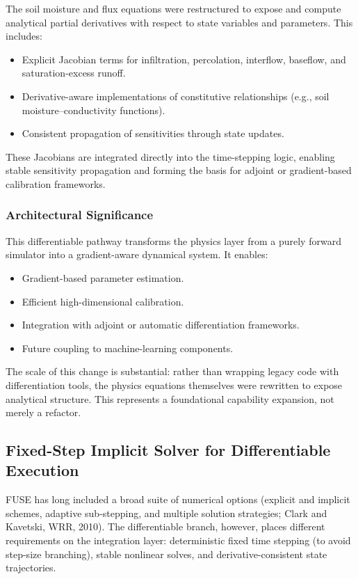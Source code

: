 \documentclass[11pt]{scrartcl}
\begin{document}
The soil moisture and flux equations were restructured to expose and
compute analytical partial derivatives with respect to state variables
and parameters. This includes:

\begin{itemize}
\item Explicit Jacobian terms for infiltration, percolation, interflow,
      baseflow, and saturation-excess runoff.
\item Derivative-aware implementations of constitutive relationships
      (e.g., soil moisture–conductivity functions).
\item Consistent propagation of sensitivities through state updates.
\end{itemize}

These Jacobians are integrated directly into the time-stepping logic,
enabling stable sensitivity propagation and forming the basis for
adjoint or gradient-based calibration frameworks.


\subsubsection{Architectural Significance}

This differentiable pathway transforms the physics layer from a purely
forward simulator into a gradient-aware dynamical system. It enables:

\begin{itemize}
\item Gradient-based parameter estimation.
\item Efficient high-dimensional calibration.
\item Integration with adjoint or automatic differentiation frameworks.
\item Future coupling to machine-learning components.
\end{itemize}

The scale of this change is substantial: rather than wrapping legacy code
with differentiation tools, the physics equations themselves were rewritten
to expose analytical structure. This represents a foundational capability
expansion, not merely a refactor.

\subsection{Fixed-Step Implicit Solver for Differentiable Execution}

FUSE has long included a broad suite of numerical options (explicit and implicit schemes,
adaptive sub-stepping, and multiple solution strategies; Clark and Kavetski, WRR, 2010).
The differentiable branch, however, places different requirements on the integration
layer: deterministic fixed time stepping (to avoid step-size branching), stable nonlinear
solves, and derivative-consistent state trajectories.
\end{document}
